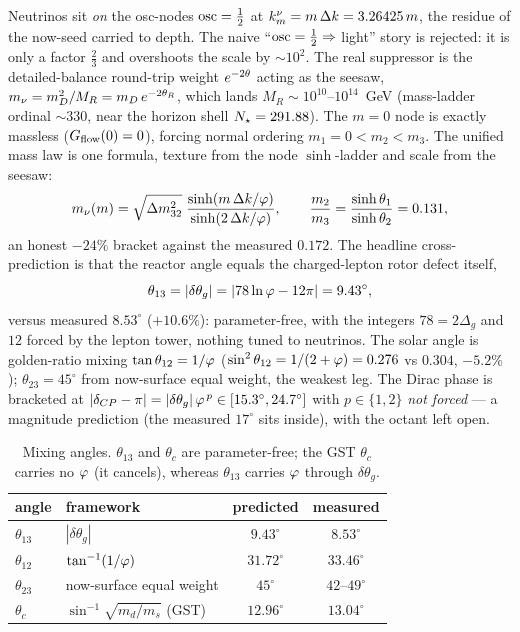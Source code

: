 Neutrinos sit \emph{on} the osc-nodes $\operatorname{osc}=\tfrac12$ at $k^\nu_m=m\,\Delta k=3.26425\,m$,
the residue of the now-seed carried to depth. The naive ``$\operatorname{osc}=\tfrac12\Rightarrow$
light'' story is rejected: it is only a factor $\tfrac23$ and overshoots the scale
by $\sim 10^2$. The real suppressor is the detailed-balance round-trip weight
$e^{-2\theta}$ acting as the seesaw, $m_\nu=m_D^2/M_R=m_D\,e^{-2\theta_R}$, which lands
$M_R\sim10^{10}$--$10^{14}$~GeV (mass-ladder ordinal $\sim330$, near the horizon
shell $N_{\star}=291.88$). The $m=0$ node is exactly massless ($G_{\mathrm{flow}}(0)=0$),
forcing normal ordering $m_1=0<m_2<m_3$. The unified mass law is one formula,
texture from the node $\sinh$-ladder and scale from the seesaw:
\begin{equation}
m_\nu(m)=\sqrt{\Delta m^2_{32}}\;
\frac{\sinh(m\,\Delta k/\varphi)}{\sinh(2\,\Delta k/\varphi)},
\qquad
\frac{m_2}{m_3}=\frac{\sinh\theta_1}{\sinh\theta_2}=0.131,
\label{eq:particles:numass}
\end{equation}
an honest $-24\%$ bracket against the measured $0.172$. The headline cross-prediction
is that the reactor angle equals the charged-lepton rotor defect itself,
\begin{equation}
\theta_{13}=|\delta\theta_g|=|78\ln\varphi-12\pi|=9.43^\circ,
\label{eq:particles:theta13}
\end{equation}
versus measured $8.53^\circ$ ($+10.6\%$): parameter-free, with the integers
$78=2\Delta_g$ and $12$ forced by the lepton tower, nothing tuned to neutrinos.
The solar angle is golden-ratio mixing $\tan\theta_{12}=1/\varphi$
($\sin^2\theta_{12}=1/(2+\varphi)=0.276$ vs $0.304$, $-5.2\%$); $\theta_{23}=45^\circ$
from now-surface equal weight, the weakest leg. The Dirac phase is bracketed at
$|\delta_{CP}-\pi|=|\delta\theta_g|\,\varphi^{\,p}\in[15.3^\circ,24.7^\circ]$ with
$p\in\{1,2\}$ \emph{not forced} --- a magnitude prediction (the measured
$17^\circ$ sits inside), with the octant left open.

\begin{table}[ht]\centering
\begin{tabular}{llcc}
\toprule
angle & framework & predicted & measured \\
\midrule
$\theta_{13}$ & $|\delta\theta_g|$            & $9.43^\circ$  & $8.53^\circ$ \\
$\theta_{12}$ & $\tan^{-1}(1/\varphi)$         & $31.72^\circ$ & $33.46^\circ$ \\
$\theta_{23}$ & now-surface equal weight       & $45^\circ$    & $42$--$49^\circ$ \\
$\theta_c$    & $\sin^{-1}\!\sqrt{m_d/m_s}$ (GST) & $12.96^\circ$ & $13.04^\circ$ \\
\bottomrule
\end{tabular}
\caption{Mixing angles. $\theta_{13}$ and $\theta_c$ are parameter-free; the GST
$\theta_c$ carries no $\varphi$ (it cancels), whereas $\theta_{13}$ carries $\varphi$
through $\delta\theta_g$.}
\label{tab:particles:mixing}
\end{table}
